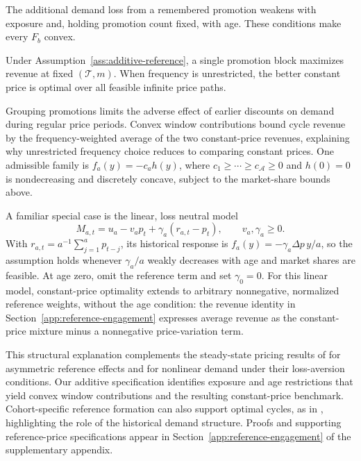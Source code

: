 The additional demand loss from a remembered promotion weakens with exposure and, holding promotion count fixed, with age. These conditions make every \(F_b\) convex.

\begin{proposition}\label{prop:reference-constant-price}
Under Assumption~\ref{ass:additive-reference}, a single promotion block maximizes revenue at fixed \((\mathcal T,m)\). When frequency is unrestricted, the better constant price is optimal over all feasible infinite price paths.
\end{proposition}

Grouping promotions limits the adverse effect of earlier discounts on demand during regular price periods. Convex window contributions bound cycle revenue by the frequency-weighted average of the two constant-price revenues, explaining why unrestricted frequency choice reduces to comparing constant prices. One admissible family is \(f_a(y)=-c_a h(y)\), where \(c_1\ge\cdots\ge c_{\mathcal A}\ge0\) and \(h(0)=0\) is nondecreasing and discretely concave, subject to the market-share bounds above.

A familiar special case is the linear, loss neutral model
\begin{equation}\label{eq:reference-market-share}
 M_{a,t}=u_a-v_ap_t+\gamma_a(r_{a,t}-p_t),
 \qquad v_a,\gamma_a\ge0.
\end{equation}
With \(r_{a,t}=a^{-1}\sum_{j=1}^a p_{t-j}\), its historical response is \(f_a(y)=-\gamma_a\Delta p\,y/a\), so the assumption holds whenever \(\gamma_a/a\) weakly decreases with age and market shares are feasible. At age zero, omit the reference term and set \(\gamma_0=0\). For this linear model, constant-price optimality extends to arbitrary nonnegative, normalized reference weights, without the age condition: the revenue identity in Section~\ref{app:reference-engagement} expresses average revenue as the constant-price mixture minus a nonnegative price-variation term.

This structural explanation complements the steady-state pricing results of \citet{fibich2003reference} for asymmetric reference effects and \citet{popescu2007} for nonlinear demand under their loss-aversion conditions. Our additive specification identifies exposure and age restrictions that yield convex window contributions and the resulting constant-price benchmark. Cohort-specific reference formation can also support optimal cycles, as in \citet{wang2016reference}, highlighting the role of the historical demand structure. Proofs and supporting reference-price specifications appear in Section~\ref{app:reference-engagement} of the supplementary appendix.

\par\endgroup
